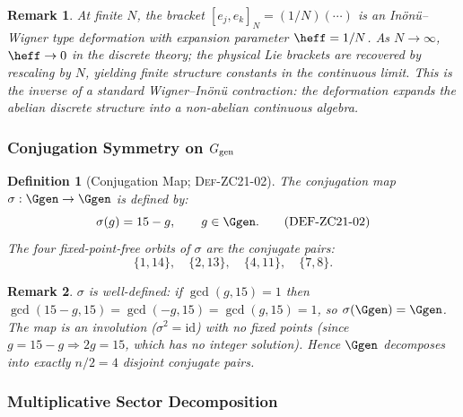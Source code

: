 \documentclass[12pt, a4paper]{article}
\newtheorem{definition}{Definition}[section]
\newtheorem{remark}{Remark}[section]
\begin{document}
\begin{remark}
At finite $N$, the bracket $[e_j, e_k]_N = (1/N)(\cdots)$ is
an Inönü--Wigner type deformation with expansion parameter $\heff = 1/N$.
As $N\to\infty$, $\heff \to 0$ in the discrete theory;
the physical Lie brackets are recovered by rescaling by $N$,
yielding finite structure constants in the continuous limit.
This is the \emph{inverse} of a standard Wigner--Inönü contraction:
the deformation \emph{expands} the abelian discrete structure
into a non-abelian continuous algebra.
\end{remark}

\subsubsection{Conjugation Symmetry on $G_{\rm gen}$}

\begin{definition}[Conjugation Map; \textsc{Def-ZC21-02}]
\label{zc21:def:sigma}
The \emph{conjugation map} $\sigma: \Ggen \to \Ggen$ is defined by:
\begin{equation}
  \sigma(g) = 15 - g, \qquad g \in \Ggen.
  \tag{DEF-ZC21-02}
\end{equation}
The four fixed-point-free orbits of $\sigma$ are the
\emph{conjugate pairs}:
\begin{equation*}
  \{1, 14\}, \quad \{2, 13\}, \quad \{4, 11\}, \quad \{7, 8\}.
\end{equation*}
\end{definition}

\begin{remark}
$\sigma$ is well-defined: if $\gcd(g,15)=1$ then
$\gcd(15-g,15) = \gcd(-g,15) = \gcd(g,15) = 1$,
so $\sigma(\Ggen) = \Ggen$.
The map is an involution ($\sigma^2 = \mathrm{id}$) with no fixed points
(since $g = 15-g \Rightarrow 2g = 15$, which has no integer solution).
Hence $\Ggen$ decomposes into exactly $n/2 = 4$ disjoint conjugate pairs.
\end{remark}

\subsubsection{Multiplicative Sector Decomposition}
\end{document}
